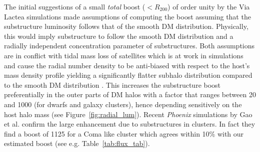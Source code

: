 \documentclass[10pt,aps,pra,reprint,amsmath,amsfonts,amssymb,showpacs,nofootinbib,floatfix]{revtex4-1}
\begin{document}
The initial suggestions of a small {\em total} boost ($<R_{200}$) of
order unity by the Via Lactea simulations \cite{2008JPhCS.125a2008K}
made assumptions of computing the boost assuming that the substructure
luminosity follows that of the smooth DM distribution. Physically,
this would imply substructure to follow the smooth DM distribution and
a radially independent concentration parameter of substructures. Both
assumptions are in conflict with tidal mass loss of satellites which
is at work in simulations and cause the radial number density to be
anti-biased with respect to the host's mass density profile yielding a
significantly flatter subhalo distribution compared to the smooth DM
distribution \cite{2010ApJ...718..899A}. This increases the
substructure boost preferentially in the outer parts of DM halos with
a factor that ranges between 20 and 1000 (for dwarfs and galaxy
clusters), hence depending sensitively on the host halo mass (see
Figure~\ref{fig:radial_lum}). Recent {\it Phoenix} simulations by Gao
et al. \cite{2011arXiv1107.1916G} confirm the large enhancement due to
substructures in clusters. In fact they find a boost of 1125 for a
Coma like cluster which agrees within 10\% with our estimated boost
(see e.g. Table~\ref{tab:flux_tab}).
\end{document}
